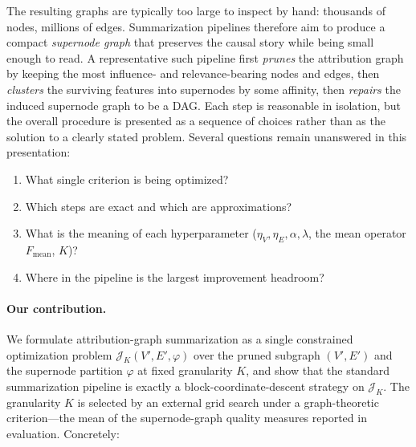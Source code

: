 \documentclass[table, 11pt]{article}
\begin{document}
The resulting graphs are typically too large to inspect by hand:
thousands of nodes, millions of edges. Summarization pipelines
therefore aim to produce a compact \emph{supernode graph} that
preserves the causal story while being small enough to read. A
representative such pipeline first \emph{prunes} the attribution
graph by keeping the most influence- and relevance-bearing nodes and
edges, then \emph{clusters} the surviving features into supernodes by
some affinity, then \emph{repairs} the induced supernode graph to be
a DAG. Each step is reasonable in isolation, but the overall
procedure is presented as a sequence of choices rather than as the
solution to a clearly stated problem. Several questions remain
unanswered in this presentation:

\begin{enumerate}[leftmargin=*,topsep=2pt,itemsep=2pt]
\item What single criterion is being optimized?
\item Which steps are exact and which are approximations?
\item What is the meaning of each hyperparameter
($\eta_V, \eta_E, \alpha, \lambda$, the mean operator $F_{\text{mean}}$,
$K$)?
\item Where in the pipeline is the largest improvement headroom?
\end{enumerate}

\paragraph{Our contribution.} We formulate attribution-graph
summarization as a single constrained optimization problem
$\mathcal{J}_K(V', E', \varphi)$ over the pruned subgraph $(V', E')$
and the supernode partition $\varphi$ at fixed granularity $K$, and
show that the standard summarization pipeline is exactly a
block-coordinate-descent strategy on $\mathcal{J}_K$.
The granularity $K$ is selected by an external grid search under a
graph-theoretic criterion---the mean of the supernode-graph quality
measures reported in evaluation. Concretely:
\end{document}
